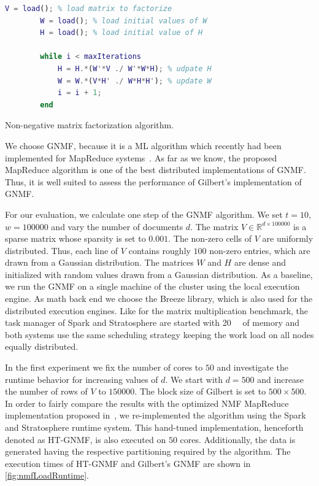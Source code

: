 \begin{listing}[!h]
	\begin{CenteredBox}
		\begin{lstlisting}[language=Matlab,
			commentstyle=\color{black},
		  stringstyle=\color{black},
		  keywordstyle=\color{black}\bfseries,
		]
		V = load(); % load matrix to factorize
		W = load(); % load initial values of W
		H = load(); % load initial value of H

		while i < maxIterations
			H = H.*(W'*V ./ W'*W*H); % udpate H
			W = W.*(V*H' ./ W*H*H'); % update W
			i = i + 1;
		end
		\end{lstlisting}
	\end{CenteredBox}
	\caption{Non-negative matrix factorization algorithm.}
	\label{lst:nmf}
\end{listing}

We choose GNMF, because it is a ML algorithm which recently had been implemented for MapReduce systems~\cite{liu:2010a}.
As far as we know, the proposed MapReduce algorithm is one of the best distributed implementations of GNMF.
Thus, it is well suited to assess the performance of Gilbert's implementation of GNMF.

For our evaluation, we calculate one step of the GNMF algorithm.
We set $t=10$, $w=100000$ and vary the number of documents $d$.
The matrix $V\in\mathbb{R}^{d\times 100000}$ is a sparse matrix whose sparsity is set to $0.001$.
The non-zero cells of $V$ are uniformly distributed.
Thus, each line of $V$ contains roughly $100$ non-zero entries, which are drawn from a Gaussian distribution.
The matrices $W$ and $H$ are dense and initialized with random values drawn from a Gaussian distribution.
As a baseline, we run the GNMF on a single machine of the cluster using the local execution engine.
As math back end we choose the Breeze library, which is also used for the distributed execution engines.
Like for the matrix multiplication benchmark, the task manager of Spark and Stratosphere are started with \SI{20}{\giga\byte} of memory and both systems use the same scheduling strategy keeping the work load on all nodes equally distributed.

In the first experiment we fix the number of cores to $50$ and investigate the runtime behavior for increasing values of $d$.
We start with $d=500$ and increase the number of rows of $V$ to $150000$.
The block size of Gilbert is set to $500 \times 500$.
In order to fairly compare the results with the optimized NMF MapReduce implementation proposed in~\cite{liu:2010a}, we re-implemented the algorithm using the Spark and Stratosphere runtime system.
This hand-tuned implementation, henceforth denoted as HT-GNMF, is also executed on $50$ cores.
Additionally, the data is generated having the respective partitioning required by the algorithm.
The execution times of HT-GNMF and Gilbert's GNMF are shown in \cref{fig:nmfLoadRuntime}.

